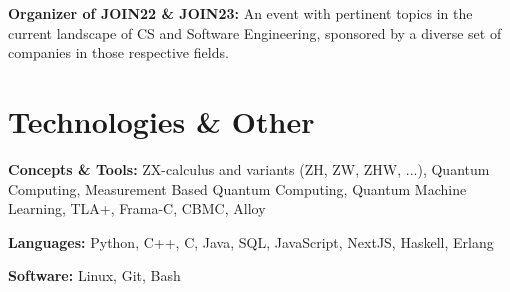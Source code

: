 \documentclass[10pt, letterpaper]{article}
\begin{document}
        \vspace{0.2 cm}

        \begin{onecolentry}
            \textbf{Organizer of JOIN22 \& JOIN23:} An event with pertinent topics in the current landscape of CS and Software Engineering, sponsored by a diverse set of companies in those respective fields.
        \end{onecolentry}
        

    \section{Technologies \& Other}

        \begin{onecolentry}
            \textbf{Concepts \& Tools:} ZX-calculus and variants (ZH, ZW, ZHW, ...), Quantum Computing, Measurement Based Quantum Computing, Quantum Machine Learning, TLA+, Frama-C, CBMC, Alloy
        \end{onecolentry}

        \vspace{0.2 cm}

        \begin{onecolentry}
            \textbf{Languages:} Python, C++, C, Java, SQL, JavaScript, NextJS, Haskell, Erlang
        \end{onecolentry}

        \vspace{0.2 cm}

        \begin{onecolentry}
            \textbf{Software:} Linux, Git, Bash
        \end{onecolentry}



    
\end{document}
